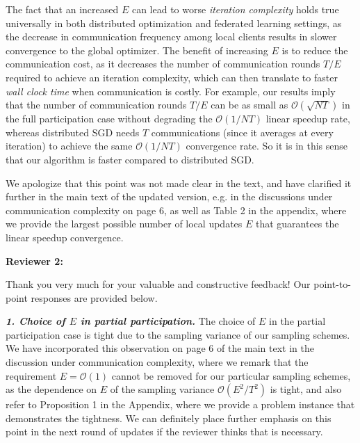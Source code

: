 \documentclass{article}
\begin{document}
The fact that an increased $E$ can lead to worse \emph{iteration complexity} holds true universally in both distributed optimization and federated learning settings, as the decrease in communication frequency among local clients results in slower convergence to the global optimizer. The benefit of increasing $E$ is to reduce the communication cost, as it decreases the number of communication rounds $T/E$ required to achieve an iteration complexity, which can then translate to faster \emph{wall clock time} when communication is costly. For example, our results imply that the number of communication rounds $T/E$ can be as small as $\mathcal{O}(\sqrt{NT})$ in the full participation case without degrading the $\mathcal{O}(1/NT)$ linear speedup rate, whereas distributed SGD needs $T$ communications (since it averages at every iteration) to achieve the same $\mathcal{O}(1/NT)$ convergence rate. So it is in this sense that our algorithm is faster compared to distributed SGD.

We apologize that this point was not made clear in the text, and have clarified it further in the main text of the updated version, e.g. in the discussions under communication complexity on page 6, as well as Table 2 in the appendix, where we provide the largest possible number of local updates $E$ that guarantees the linear speedup convergence.

\begin{comment}
Due to the heterogeneity in data at local sources, when the number of local SGD updates $E$ increases, the parameter at each local client drifts further towards the optimizer of the local optimization problem rather than the global problem, and so the convergence of FedAvg is expected to degrade with increased $E$.
\end{comment}


{\color{blue}\textbf{Reviewer 2:}} 

Thank you very much for your valuable and constructive feedback! Our point-to-point responses are provided below.


\textbf{\textit{1. Choice of $E$ in partial participation.}}
The choice of $E$ in the partial participation case is tight due to the sampling variance of our sampling schemes. We have incorporated this observation on page 6 of the main text in the discussion under communication complexity, where we remark that the requirement $E=\mathcal{O}(1)$ cannot be removed for our particular sampling schemes, as the dependence on $E$ of the sampling variance $\mathcal{O}(E^2/T^2)$ is tight, and also refer to Proposition 1 in the Appendix, where we provide a problem instance that demonstrates the tightness. We can definitely place further emphasis on this point in the next round of updates if the reviewer thinks that is necessary. 
\end{document}
